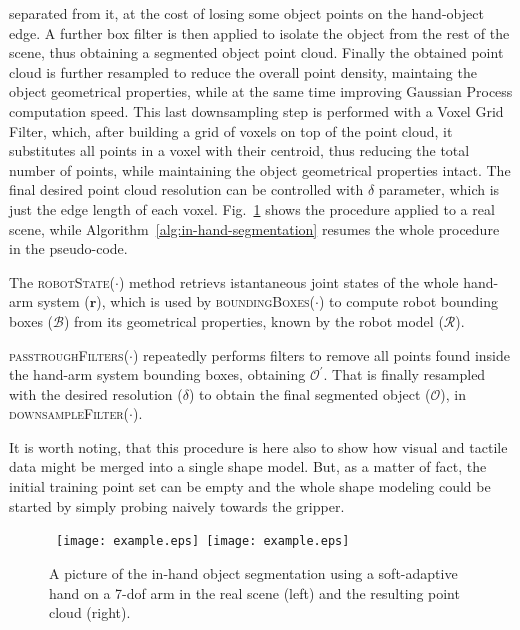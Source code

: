 separated from it, at the cost of losing some object points on the hand-object edge.
A further box filter is then applied to isolate the object from the rest of the scene,
thus obtaining a segmented object point cloud. 
Finally the obtained point cloud is further resampled to reduce the overall point
density, maintaing the object geometrical properties, while at the same time
improving Gaussian Process computation speed. 
This last downsampling step is performed with a Voxel Grid Filter, which, after
building a grid of voxels on top of the point cloud, it
substitutes all points in a voxel with their centroid, thus reducing the total number of 
points, while maintaining the object geometrical properties intact. The final desired
point cloud resolution can be controlled with $\delta$ parameter, which is just the edge length of each voxel.
Fig.~\ref{fig:in-hand-segmentation} shows the procedure applied to a real scene,
while  Algorithm~\ref{alg:in-hand-segmentation} resumes  the whole  procedure in
the pseudo-code.

The \textsc{robotState}($\cdot$) method retrievs istantaneous joint states
of the whole hand-arm system ($\mathbf{r}$), which is used by \textsc{boundingBoxes($\cdot$)} to compute robot bounding boxes ($\mathcal{B}$)
from its geometrical properties, known by the robot model ($\mathcal{R}$).

\textsc{passtroughFilters}($\cdot$) repeatedly performs filters to remove
all points found inside the hand-arm system bounding boxes, obtaining $\mathcal{O^\prime}$.
That is finally resampled with the desired resolution ($\delta$) 
to obtain the final segmented object ($\mathcal{O}$), in \textsc{downsampleFilter}($\cdot$).

It is worth noting, that this procedure is here also to show how visual and tactile
data might  be merged into a  single shape model. But,  as a matter of  fact, the
initial training  point set  can be  empty and the whole shape modeling could be 
started  by simply  probing naively towards the gripper.

\begin{figure}
\centering
  \mbox{
  \texttt{[image: example.eps]}
  \texttt{[image: example.eps]}
  }
  \caption{A picture of the in-hand object segmentation using a soft-adaptive hand on a 7-dof arm in the real scene (left) and the resulting point cloud (right).}
  \label{fig:in-hand-segmentation}
\end{figure}


